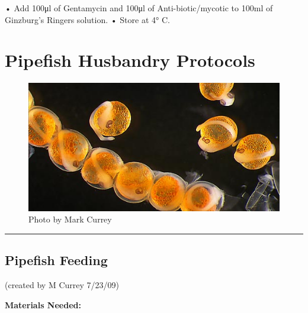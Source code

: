 \documentclass[
]{book}
\begin{document}
• Add 100μl of Gentamycin and 100μl of Anti-biotic/mycotic to 100ml of Ginzburg's Ringers solution.
• Store at 4° C.

\hypertarget{pipefish-husbandry-protocols}{%
\chapter{Pipefish Husbandry Protocols}\label{pipefish-husbandry-protocols}}

\begin{figure}
\centering
\includegraphics{images/pipefish_embryos.jpg}
\caption{Photo by Mark Currey}
\end{figure}

\begin{center}\rule{0.5\linewidth}{0.5pt}\end{center}

\hypertarget{pipefish-feeding}{%
\section{Pipefish Feeding}\label{pipefish-feeding}}

(created by M Currey 7/23/09)

\textbf{Materials Needed:}
\end{document}
